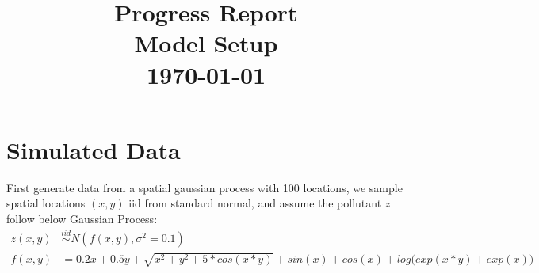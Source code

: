 \documentclass[11pt]{article}
\theoremstyle{definition}
\begin{document}

\title{Progress Report \\ Model Setup \\ \today \vspace{-1ex}}

\pretitle{\begin{flushright}\normalsize}
\posttitle{\par\end{flushright}}
\author{}
\date{}
\vspace{-10em}
\maketitle
\vspace{-5em}

\tableofcontents 

\section{\textbf{Simulated Data}}
First generate data from a spatial gaussian process with 100 locations, we sample spatial locations $(x, y)$ iid from standard normal, and assume the pollutant $z$ follow below Gaussian Process:
\begin{align*}
z(x, y) &\stackrel{iid}{\sim} N(f(x, y), \sigma^2 = 0.1) \\
f(x, y) &= 0.2 x + 0.5 y + \sqrt{x^2 + y^2 + 5*cos(x*y)} + 
sin(x) + cos(x) + log\Big(exp(x*y)+exp(x)\Big)
\end{align*}
\end{document}
